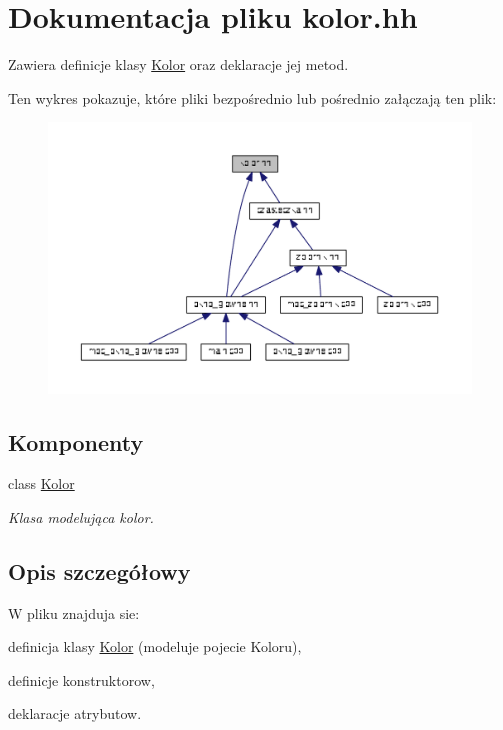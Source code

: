 \hypertarget{kolor_8hh}{}\section{Dokumentacja pliku kolor.\+hh}
\label{kolor_8hh}


Zawiera definicje klasy \hyperlink{class_kolor}{Kolor} oraz deklaracje jej metod.  


Ten wykres pokazuje, które pliki bezpośrednio lub pośrednio załączają ten plik\+:
\nopagebreak
\begin{figure}[H]
\begin{center}
\leavevmode
\includegraphics[width=350pt]{kolor_8hh__dep__incl}
\end{center}
\end{figure}
\subsection*{Komponenty}
\begin{DoxyCompactItemize}
\item 
class \hyperlink{class_kolor}{Kolor}
\begin{DoxyCompactList}\small\item\em Klasa modelująca kolor. \end{DoxyCompactList}\end{DoxyCompactItemize}


\subsection{Opis szczegółowy}
W pliku znajduja sie\+:
\begin{DoxyItemize}
\item definicja klasy \hyperlink{class_kolor}{Kolor} (modeluje pojecie Koloru),
\item definicje konstruktorow,
\item deklaracje atrybutow. 
\end{DoxyItemize}